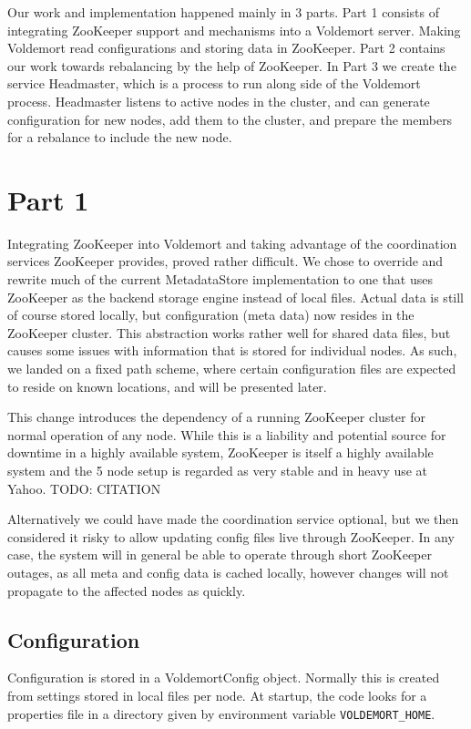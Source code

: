 
Our work and implementation happened mainly in 3 parts. Part 1 consists of integrating ZooKeeper support and mechanisms into a Voldemort server. Making Voldemort read configurations and storing data in ZooKeeper. Part 2 contains our work towards rebalancing by the help of ZooKeeper. In Part 3 we create the service Headmaster, which is a process to run along side of the Voldemort process. Headmaster listens to active nodes in the cluster, and can generate configuration for new nodes, add them to the cluster, and prepare the members for a rebalance to include the new node.

\section{Part 1}
Integrating ZooKeeper into Voldemort and taking advantage of the coordination services ZooKeeper provides, proved rather difficult.
We chose to override and rewrite much of the current MetadataStore implementation to one that uses ZooKeeper as the backend storage engine instead of local files. 
Actual data is still of course stored locally, but configuration (meta data) now resides in the ZooKeeper cluster.
This abstraction works rather well for shared data files, but causes some issues with information that is stored for individual nodes. 
As such, we landed on a fixed path scheme, where certain configuration files are expected to reside on known locations, and will be presented later.

This change introduces the dependency of a running ZooKeeper cluster for normal operation of any node. While this is a liability and potential source for downtime in a highly available system, ZooKeeper is itself a highly available system and the 5 node setup is regarded as very stable and in heavy use at Yahoo\cite{need:citation}.
TODO: CITATION

Alternatively we could have made the coordination service optional, but we then considered it risky to allow updating config files live through ZooKeeper. In any case, the system will in general be able to operate through short ZooKeeper outages, as all meta and config data is cached locally, however changes will not propagate to the affected nodes as quickly.

\subsection{Configuration}
Configuration is stored in a VoldemortConfig object. Normally this is created from settings stored in local files per node. At startup, the code looks for a properties file in a directory given by environment variable \texttt{VOLDEMORT\_HOME}. 

